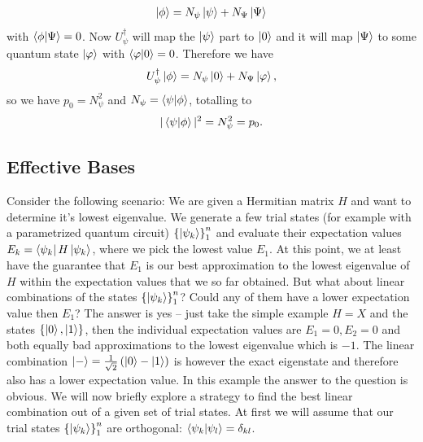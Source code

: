 \begin{align}
    \ket{\phi} = N_\psi \ket{\psi} + N_\Psi\ket{\Psi}
\end{align}
with $\braket{\phi}{\Psi}=0$. Now $U_\psi^\dagger$ will map the $\ket{\psi}$ part to $\ket{0}$ and it will map $\ket{\Psi}$ to some quantum state $\ket{\varphi}$ with $\braket{\varphi}{0}=0$. Therefore we have
\begin{align}
    U^\dagger_\psi\ket{\phi} = N_\psi \ket{0} + N_\Psi\ket{\varphi},
\end{align}
so we have $p_0=N_\psi^2$ and
    $N_\psi = \braket{\psi}{\phi}$, totalling to
\begin{align}
 |\braket{\psi}{\phi}|^2 = N_\psi^2 = p_0.
\end{align}

\subsection{Effective Bases}
Consider the following scenario: We are given a Hermitian matrix $H$ and want to determine it's lowest eigenvalue. We generate a few trial states (for example with a parametrized quantum circuit) $\left\{\ket{\psi_k}\right\}_1^n$ and evaluate their expectation values $E_k = \bra{\psi_k}H\ket{\psi_k}$, where we pick the lowest value $E_1$. 
At this point, we at least have the guarantee that $E_1$ is our best approximation to the lowest eigenvalue of $H$ within the expectation values that we so far obtained. 
But what about linear combinations of the states $\left\{\ket{\psi_k}\right\}_1^n$? 
Could any of them have a lower expectation value then $E_1$?
The answer is yes -- just take the simple example $H=X$ and the states $\left\{\ket{0},\ket{1}\right\}$, then the individual expectation values are $E_1=0, E_2=0$ and both equally bad approximations to the lowest eigenvalue which is $-1$. The linear combination $\ket{-} = \frac{1}{\sqrt{2}}\left(\ket{0} - \ket{1}\right)$ is however the exact eigenstate and therefore also has a lower expectation value. In this example the answer to the question is obvious. We will now briefly explore a strategy to find the best linear combination out of a given set of trial states. At first we will assume that our trial states $\left\{\ket{\psi_k}\right\}_1^n$ are orthogonal: $\braket{\psi_k}{\psi_l}=\delta_{kl}$.
